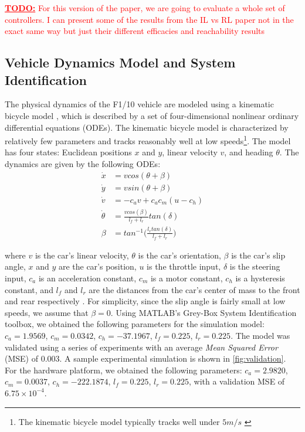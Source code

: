 \documentclass[manuscript,screen,review]{acmart}
\newcommand{\todo}[1]{\textcolor{red}{\textbf{\underline{TODO:}} #1}}
\begin{document}
\todo{For this version of the paper, we are going to evaluate a whole set of controllers. I can present some of the results from the IL vs RL paper not in the exact same way but just their different efficacies and reachability results}

\subsection{Vehicle Dynamics Model and System Identification}


The physical dynamics of the F1/10 vehicle are modeled using a kinematic bicycle model \cite{ivanov2020case,Rajamani2012,Polack2017}, which is described by a set of four-dimensional nonlinear ordinary differential equations (ODEs). The kinematic bicycle model is characterized by relatively few parameters and tracks reasonably well at low speeds\footnote{ The kinematic bicycle model typically tracks well under $5 m/s$ \cite{ivanov2020case}}. The model has four states: Euclidean positions $x$ and $y$, linear velocity $v$, and heading $\theta$. The dynamics are given by the following ODEs: 
\begin{align*}
    \Dot{x} & = vcos(\theta +\beta)\\
    \Dot{y} & = vsin(\theta + \beta)\\
    \Dot{v} & = -c_av +c_ac_m(u-c_h)\\
    \Dot{\theta} & = \frac{vcos(\beta)}{l_f+l_r}tan(\delta)\\
    \beta &= tan^{-1}\Big(\frac{l_rtan(\delta)}{l_f+l_r}\Big)
\end{align*}



\noindent where $v$ is the car's linear velocity, $\theta$ is the car's orientation, $\beta$ is the car's slip angle, $x$ and $y$ are the car's position, $u$ is the throttle input, $\delta$ is the steering input, $c_a$ is an acceleration constant, $c_m$ is a motor constant, $c_h$ is a hysteresis constant, and $l_f$ and $l_r$ are the distances from the car's center of mass to the front and rear respectively \cite{ivanov2020case}. For simplicity, since the slip angle is fairly small at low speeds, we assume that $\beta = 0$.
Using MATLAB's Grey-Box System Identification toolbox, we obtained the following parameters for the simulation model: $c_a = 1.9569$, $c_m = 0.0342$, $c_h = -37.1967$, $l_f =0.225$, $l_r = 0.225$. The model was validated using a series of experiments%
with an average \emph{Mean Squared Error} (MSE) of $0.003$. A sample experimental simulation is shown in \ref{fig:validation}. For the hardware platform, we obtained the following parameters: $c_a = 2.9820$, $c_m = 0.0037$, $c_h = -222.1874$, $l_f =0.225$, $l_r = 0.225$, with a validation MSE of $6.75 \times 10^{-4}$.
\end{document}
